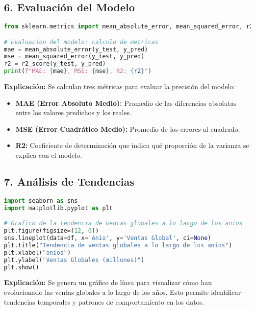 \documentclass[12pt]{article}
\begin{document}
\subsection{6. Evaluación del Modelo}
\begin{lstlisting}[language=Python]
from sklearn.metrics import mean_absolute_error, mean_squared_error, r2_score

# Evaluacion del modelo: calculo de metricas
mae = mean_absolute_error(y_test, y_pred)
mse = mean_squared_error(y_test, y_pred)
r2 = r2_score(y_test, y_pred)
print(f"MAE: {mae}, MSE: {mse}, R2: {r2}")
\end{lstlisting}
\textbf{Explicación:}  
Se calculan tres métricas para evaluar la precisión del modelo:
\begin{itemize}
    \item \textbf{MAE (Error Absoluto Medio):} Promedio de las diferencias absolutas entre los valores predichos y los reales.
    \item \textbf{MSE (Error Cuadrático Medio):} Promedio de los errores al cuadrado.
    \item \textbf{R2:} Coeficiente de determinación que indica qué proporción de la varianza se explica con el modelo.
\end{itemize}

\subsection{7. Análisis de Tendencias}
\begin{lstlisting}[language=Python]
import seaborn as sns
import matplotlib.pyplot as plt

# Grafico de la tendencia de ventas globales a lo largo de los anios
plt.figure(figsize=(12, 6))
sns.lineplot(data=df, x='Anio', y='Ventas Global', ci=None)
plt.title("Tendencia de ventas globales a lo largo de los anios")
plt.xlabel("anios")
plt.ylabel("Ventas Globales (millones)")
plt.show()
\end{lstlisting}
\textbf{Explicación:}  
Se genera un gráfico de línea para visualizar cómo han evolucionado las ventas globales a lo largo de los años. Esto permite identificar tendencias temporales y patrones de comportamiento en los datos.
\end{document}
